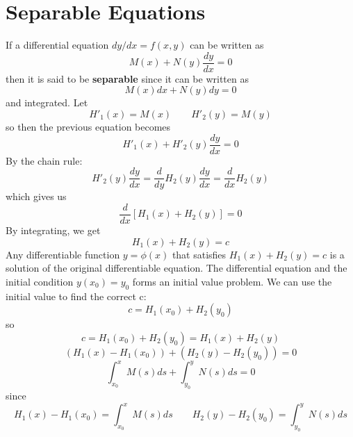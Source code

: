 \section{Separable Equations}
    If a differential equation $dy/dx = f(x, y)$ can be written as 
    \begin{equation*}
        M(x) + N(y)\frac{dy}{dx} = 0
    \end{equation*}
    then it is said to be \textbf{separable} since it can be written as $$M(x)dx + N(y)dy = 0$$ and integrated.
    \newline \indent
    Let
    \begin{equation*}
        H'_1(x) = M(x) \qquad H'_2(y) = M(y)
    \end{equation*}
    so then the previous equation becomes
    \begin{equation*}
        H'_1(x) + H'_2(y)\frac{dy}{dx} = 0
    \end{equation*}
    By the chain rule:
    \begin{equation*}
        H'_2(y)\frac{dy}{dx} = \frac{d}{dy}H_2(y)\frac{dy}{dx} = \frac{d}{dx}H_2(y)
    \end{equation*}
    which gives us
    \begin{equation*}
        \frac{d}{dx}[H_1(x) + H_2(y)] = 0
    \end{equation*}
    By integrating, we get
    \begin{equation*}
        H_1(x) + H_2(y) = c
    \end{equation*}
    Any differentiable function $y = \phi(x)$ that satisfies $H_1(x) + H_2(y) = c$ is a solution of the original differentiable equation. The differential equation and the initial condition $y(x_0) = y_0$ forms an initial value problem. We can use the initial value to find the correct c:
    \begin{equation*}
        c = H_1(x_0) + H_2(y_0)
    \end{equation*}
    so
    \begin{equation*}
        c = H_1(x_0) + H_2(y_0) = H_1(x) + H_2(y)
    \end{equation*}
    \begin{equation*}
        (H_1(x) - H_1(x_0)) + (H_2(y) - H_2(y_0)) = 0
    \end{equation*}
    \begin{equation*}
        \int_{x_0}^x M(s) ds + \int_{y_0}^y N(s) ds = 0
    \end{equation*}
    since 
    \begin{equation*}
        H_1(x) - H_1(x_0) = \int_{x_0}^x M(s) ds \qquad H_2(y) - H_2(y_0) = \int_{y_0}^y N(s) ds
    \end{equation*}
